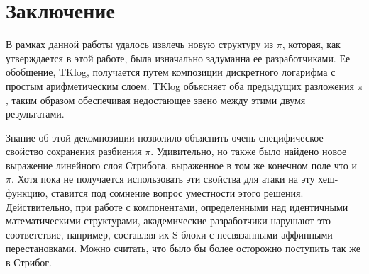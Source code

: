 \section{Заключение}
В рамках данной работы удалось извлечь новую структуру из \(\pi\), которая, как утверждается в этой работе, была изначально задуманна ее разработчиками. Ее обобщение, TKlog, получается путем композиции дискретного логарифма с простым арифметическим слоем. TKlog объясняет оба предыдущих разложения \(\pi\), таким образом обеспечивая недостающее звено между этими двумя результатами.

Знание об этой декомпозиции позволило объяснить очень специфическое свойство сохранения разбиения \(\pi\). Удивительно, но также было найдено новое выражение линейного слоя Стрибога, выраженное в том же конечном поле что и \(\pi\). Хотя пока не получается использовать эти свойства для атаки на эту хеш-функцию, ставится под сомнение вопрос уместности этого решения. Действительно, при работе с компонентами, определенными над идентичными математическими структурами, академические разработчики нарушают это соответствие, например, составляя их S-блоки с несвязанными аффинными перестановками. Можно считать, что было бы более осторожно поступить так же в Стрибог.
